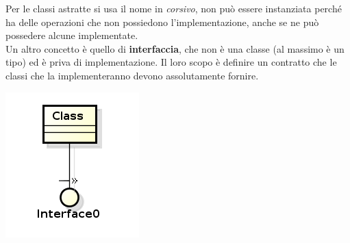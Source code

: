 Per le classi astratte si usa il nome in \textit{corsivo}, non può essere instanziata perché ha delle operazioni che non possiedono l'implementazione, anche se ne può possedere alcune implementate.\\
Un altro concetto è quello di \textbf{interfaccia}, che non è una classe (al massimo è un tipo) ed è priva di implementazione. Il loro scopo è definire un contratto che le classi che la implementeranno devono assolutamente fornire.

\begin{center}

\includegraphics[width=0.75\columnwidth]{img16} %

\end{center}

